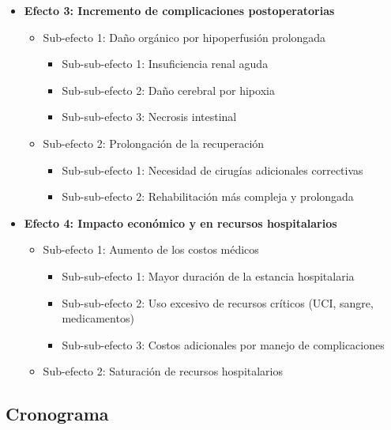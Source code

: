 \begin{itemize}
    \item \textbf{Efecto 3: Incremento de complicaciones postoperatorias}
    \begin{itemize}
        \item Sub-efecto 1: Daño orgánico por hipoperfusión prolongada
        \begin{itemize}
            \item Sub-sub-efecto 1: Insuficiencia renal aguda
            \item Sub-sub-efecto 2: Daño cerebral por hipoxia
            \item Sub-sub-efecto 3: Necrosis intestinal
        \end{itemize}
        \item Sub-efecto 2: Prolongación de la recuperación
        \begin{itemize}
            \item Sub-sub-efecto 1: Necesidad de cirugías adicionales correctivas
            \item Sub-sub-efecto 2: Rehabilitación más compleja y prolongada
        \end{itemize}
    \end{itemize}
    
    \item \textbf{Efecto 4: Impacto económico y en recursos hospitalarios}
    \begin{itemize}
        \item Sub-efecto 1: Aumento de los costos médicos
        \begin{itemize}
            \item Sub-sub-efecto 1: Mayor duración de la estancia hospitalaria
            \item Sub-sub-efecto 2: Uso excesivo de recursos críticos (UCI, sangre, medicamentos)
            \item Sub-sub-efecto 3: Costos adicionales por manejo de complicaciones
        \end{itemize}
        \item Sub-efecto 2: Saturación de recursos hospitalarios
    \end{itemize}
\end{itemize}

\newpage

\subsection*{Cronograma}

